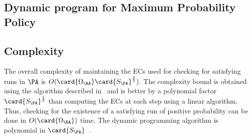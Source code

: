 \subsection{Dynamic program for Maximum Probability Policy}



\subsection{Complexity}
The overall complexity of maintaining the ECs used for checking
for satisfying runs in $\PA$ is $O(\card{\Omega_\RA} \card{S_\PA}^{\frac{3}{2}})$.
The complexity bound is obtained using the algorithm described
in~\cite{Haeupler2012} and is better by a polynomial factor
$\card{S_\PA}^{\frac{1}{2}}$ than computing the ECs at each
step using a linear algorithm.
Thus, checking for the existence of a satisfying run of positive probability
can be done in $O(\card{\Omega_\RA})$ time.
The dynamic programming algorithm is polynomial in
$\card{S_\PA}$~\cite{papadimitriou1987}.

%
%
%

